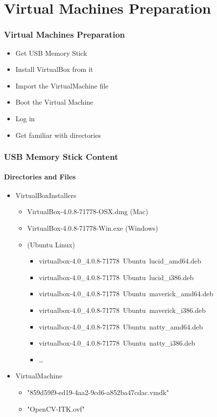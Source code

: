 \section{Virtual Machines Preparation}


\begin{frame}
\frametitle{Virtual Machines Preparation}
\begin{itemize}
\item Get USB Memory Stick
\pause
\item Install VirtualBox from it
\pause
\item Import the VirtualMachine file
\pause
\item Boot the Virtual Machine
\pause
\item Log in
\pause
\item Get familiar with directories
\end{itemize}
\end{frame}


\begin{frame}
\frametitle{USB Memory Stick Content}
\framesubtitle{Directories and Files}
\begin{itemize}
\item VirtualBoxInstallers
\begin{itemize}
\item VirtualBox-4.0.8-71778-OSX.dmg (Mac)
\item VirtualBox-4.0.8-71778-Win.exe (Windows)
\item (Ubuntu Linux)
\begin{itemize}
\item virtualbox-4.0\_4.0.8-71778~Ubuntu~lucid\_amd64.deb
\item virtualbox-4.0\_4.0.8-71778~Ubuntu~lucid\_i386.deb
\item virtualbox-4.0\_4.0.8-71778~Ubuntu~maverick\_amd64.deb
\item virtualbox-4.0\_4.0.8-71778~Ubuntu~maverick\_i386.deb
\item virtualbox-4.0\_4.0.8-71778~Ubuntu~natty\_amd64.deb
\item virtualbox-4.0\_4.0.8-71778~Ubuntu~natty\_i386.deb
\item \ldots
\end{itemize}
\end{itemize}
\pause
\item VirtualMachine
\begin{itemize}
\item  "{859d59f9-ed19-4aa2-9cd6-a852ba47cdac}.vmdk"
\item  "OpenCV-ITK.ovf"
\end{itemize}
\end{itemize}
\end{frame}

